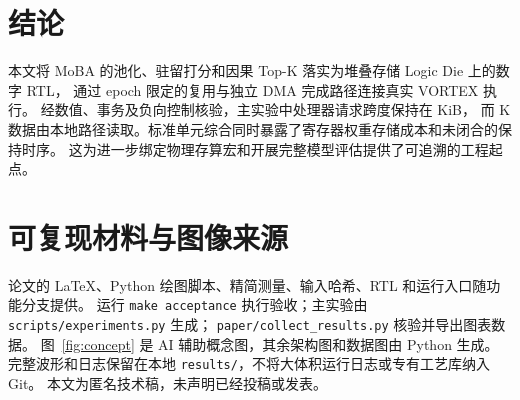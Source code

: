 \documentclass[conference,a4paper]{IEEEtran}
\begin{document}
\section{结论}
本文将 MoBA 的池化、驻留打分和因果 Top-K 落实为堆叠存储 Logic Die 上的数字 RTL，
通过 epoch 限定的复用与独立 DMA 完成路径连接真实 VORTEX 执行。
经数值、事务及负向控制核验，主实验中处理器请求跨度保持在 \HostGateKiB{} KiB，
而 K 数据由本地路径读取。标准单元综合同时暴露了寄存器权重存储成本和未闭合的保持时序。
这为进一步绑定物理存算宏和开展完整模型评估提供了可追溯的工程起点。

\section*{可复现材料与图像来源}
论文的 LaTeX、Python 绘图脚本、精简测量、输入哈希、RTL 和运行入口随功能分支提供。
运行 \texttt{make acceptance} 执行验收；主实验由 \texttt{scripts/experiments.py} 生成；
\texttt{paper/collect\_results.py} 核验并导出图表数据。
图~\ref{fig:concept} 是 AI 辅助概念图，其余架构图和数据图由 Python 生成。
完整波形和日志保留在本地 \texttt{results/}，不将大体积运行日志或专有工艺库纳入 Git。
本文为匿名技术稿，未声明已经投稿或发表。



\end{document}
